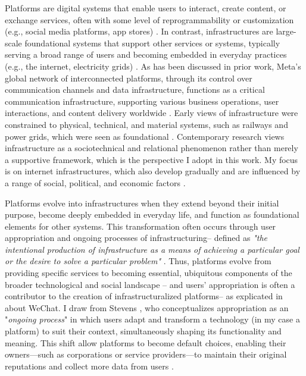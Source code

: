 Platforms are digital systems that enable users to interact, create content, or exchange services, often with some level of reprogrammability or customization (e.g., social media platforms, app stores) \cite{doi:10.1177/2056305115603080, 10.1145/3313831.3376201, doi:10.1177/1461444816661553}. In contrast, infrastructures are large-scale foundational systems that support other services or systems, typically serving a broad range of users and becoming embedded in everyday practices (e.g., the internet, electricity grids) \cite{star1996steps}. As has been discussed in prior work, Meta’s global network of interconnected platforms, through its control over communication channels and data infrastructure, functions as a critical communication infrastructure, supporting various business operations, user interactions, and content delivery worldwide \cite{lunden2024meta}. Early views of infrastructure were constrained to physical, technical, and material systems, such as railways and power grids, which were seen as foundational \cite{article2006}. Contemporary research \cite{star1996steps} views infrastructure as a sociotechnical and relational phenomenon rather than merely a supportive framework, which is the perspective I adopt in this work. My focus is on internet infrastructures, which also develop gradually and are influenced by a range of social, political, and economic factors \cite{doi:10.1177/14614448231152546}. 

Platforms evolve into infrastructures when they extend beyond their initial purpose, become deeply embedded in everyday life, and function as foundational elements for other systems. This transformation often occurs through user appropriation and ongoing processes of infrastructuring-- defined as \textit{"the intentional production of infrastructure as a means of achieving a particular goal or the desire to solve a particular problem"} \cite{10.1145/3359175, 10.1145/2818048.2820015, doi:10.1177/0162243913516012}. Thus, platforms evolve from providing specific services to becoming essential, ubiquitous components of the broader technological and social landscape \cite{doi:10.1177/1461444816661553}-- and users' appropriation is often a contributor to the creation of infrastructuralized platforms-- as explicated in \cite{10.1145/3313831.3376201} about WeChat. I draw from Stevens \cite{stevens2009appropriation}, who conceptualizes appropriation as an "\textit{ongoing process}" in which users adapt and transform a technology (in my case a platform) to suit their context, simultaneously shaping its functionality and meaning. This shift allow platforms to become default choices, enabling their owners—such as corporations or service providers—to maintain their original reputations and collect more data from users \cite{10.1145/3313831.3376201}. 

